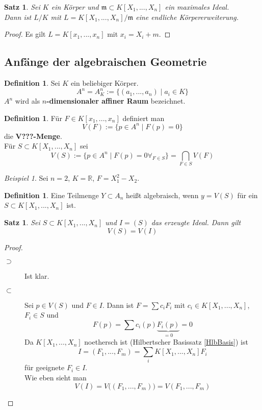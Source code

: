 \documentclass[10pt,a4paper]{article}
\newcommand{\R}{\ensuremath{\mathbb{R}}}
\theoremstyle{plain}
\newtheorem{satz}[theorem]{Satz}
\theoremstyle{definition}
\newtheorem{definition}[theorem]{Definition}
\theoremstyle{remark}
\newtheorem{exm}[theorem]{Beispiel}
\begin{document}
	\begin{satz}
		Sei $K$ ein Körper und $\mathfrak m\subset K[X_1,...,X_n]$ ein maximales Ideal.\\
		Dann ist $L/K$ mit $L=K[X_1,...,X_n]/\mathfrak m$ eine endliche Körpererweiterung.
	\end{satz}
	\begin{proof}
		Es gilt $L=K[x_1,...,x_n]$ mit $x_i=X_i+m$.
	\end{proof}




	\subsection{Anfänge der algebraischen Geometrie}
	
	\begin{definition}
		Sei $K$ ein beliebiger Körper.
		\[A^n=A_K^n:=\{(a_1,...,a_n)\mid a_i\in K\}\]
		$A^n$ wird als \textbf{$n$-dimensionaler affiner Raum} bezeichnet.\\
	\end{definition}
	\begin{definition}
		Für $F\in K[x_1,...,x_n]$ definiert man
		\[V(F):=\{p\in A^n\mid F(p)=0\}\]
		die \textbf{V???-Menge}.\\
		Für $S\subset K[X_1,...,X_n]$ sei
		\[V(S):=\{p\in A^n\mid F(p)=0\forall_{F\in S}\}=\bigcap_{F\in S}V(F)\]
	\end{definition}

	\begin{exm}
		Sei $n=2$, $K=\R$, $F=X^2_1-X_2$.
	\end{exm}

	\begin{definition}
		Eine Teilmenge $Y\subset A_n$ heißt algebraisch, wenn $y=V(S)$ für ein $S\subset K[X_1,...,X_n]$ ist.
	\end{definition}

	\begin{satz}
		Sei $S\subset K[X_1,...,X_n]$ und $I=(S)$ das erzeugte Ideal. Dann gilt
		\[V(S)=V(I)\]
	\end{satz}
	\begin{proof}
		\begin{description}
			\item[$\supset$] Ist klar.
			\item[$\subset$] Sei $p\in V(S)$ und $F\in I$. Dann ist $F=\sum c_iF_i$ mit $c_i\in K[X_1,...,X_n]$, $F_i\in S$ und
			\[F(p)=\sum c_i(p)\underbrace{F_i(p)}_{=0}=0\]
			Da $K[X_1,...,X_n]$ noethersch ist (Hilbertscher Basissatz \ref{HlbBasis}) ist
			\[I=(F_1,...,F_m)=\sum_i K[X_1,...,X_n]F_i\]
			für geeignete $F_i\in I$.\\
			Wie eben sieht man 
			\[V(I)=V\big((F_1,...,F_m)\big)=V(F_1,...,F_m)\]
		\end{description}
	\end{proof}
	
\end{document}
